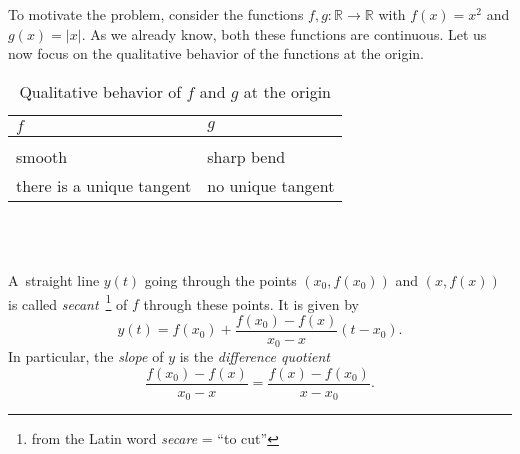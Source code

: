 

To motivate the problem, consider the functions $f,g:\mathbb{R}\to\mathbb{R}$ with $f(x)=x^2$ and $g(x)=|x|$.
As we already know, both these functions are continuous. Let us now focus on the qualitative behavior of the functions at the origin.
\renewcommand{\arraystretch}{1.5}
\begin{table}[h!]\begin{center}
\begin{tabular}{|l|l|}
\hline $f$&$g$\\
\hline\hline&\\[-0.7cm]
smooth& sharp bend\\\hline
there is a unique tangent& no unique tangent\\\hline
\end{tabular}~\\~\\\caption{Qualitative behavior of $f$ and $g$ at the origin}\label{tab:ewcf}\end{center}
\end{table}
\renewcommand{\arraystretch}{1}\newpage
A~straight line $y(t)$ going through the points $(x_0,f(x_0))$ and $(x,f(x))$ is called
\emph{secant}~\footnote{from the Latin word {\em secare} = ``to cut''}
 of $f$ through these points. It is given by
\[y(t)=f(x_0)+\frac{f(x_0)-f(x)}{x_0-x}(t-x_0) .\]
In particular, the \emph{slope} of $y$ is the \emph{difference quotient}
\[\frac{f(x_0)-f(x)}{x_0-x}=\frac{f(x)-f(x_0)}{x-x_0}.\]
